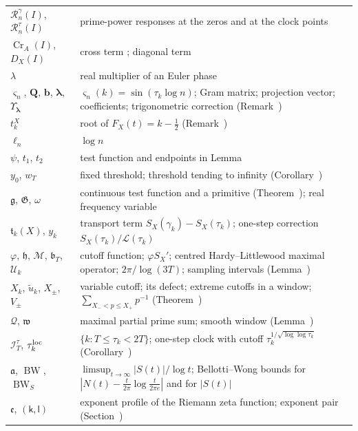 \documentclass[preprint,12pt]{elsarticle}
\makeatletter
\let\CG@origref\ref
\let\CG@origeqref\eqref
\newcommand{\CG@gettip}[1]{\@ifundefined{CGTip@#1}{Reference: #1}{\csname CGTip@#1\endcsname}}
\DeclareRobustCommand{\CGref}[1]{\pdftooltip{\CG@origref{#1}}{\CG@gettip{#1}}}
\DeclareRobustCommand{\CGeqref}[1]{\pdftooltip{\CG@origeqref{#1}}{\CG@gettip{#1}}}
\numberwithin{equation}{section}
\theoremstyle{plain}
\theoremstyle{definition}
\theoremstyle{remark}
\newcommand{\lL}{\mathcal L}
\newcommand{\Cr}{\operatorname{Cr}}
\newcommand{\BW}{\operatorname{BW}}
\newcommand{\Rg}{\mathcal R^{\gamma}}
\newcommand{\Rt}{\mathcal R^{\tau}}
\newcommand{\BWS}{\operatorname{BW}_S}
\makeatother
\begin{document}
\begin{center}
\begin{longtable}{p{}p{}}
$\Rg_n(I)$, $\Rt_n(I)$ & prime-power responses at the zeros and at the clock points \CGeqref{eq:two_responses}\\
$\Cr_A(I)$, $D_X(I)$ & cross term \CGeqref{eq:Cr_def}; diagonal term \CGeqref{eq:full_factor_gain}\\
$\lambda$ & real multiplier of an Euler phase\\
$\varsigma_n$, $\mathbf Q$, $\mathbf b$, $\boldsymbol\lambda$, $\Upsilon_{\boldsymbol\lambda}$ & $\varsigma_n(k)=\sin(\tau_k\log n)$; Gram matrix; projection vector; coefficients; trigonometric correction (Remark~\CGref{rem:matrix_projection})\\
$t_k^X$ & root of $F_X(t)=k-\frac12$ (Remark~\CGref{rem:localization})\\
$\ell_n$ & $\log n$\\
$\psi$, $t_1$, $t_2$ & test function and endpoints in Lemma~\CGref{lem:first_moment_identity}\\
$y_0$, $w_T$ & fixed threshold; threshold tending to infinity (Corollary~\CGref{cor:dichotomy})\\
$\mathfrak g$, $\mathfrak G$, $\omega$ & continuous test function and a primitive (Theorem~\CGref{thm:identity_g}); real frequency variable\\
$\mathfrak t_k(X)$, $y_k$ & transport term $S_X(\gamma_k)-S_X(\tau_k)$; one-step correction $S_X(\tau_k)/\lL(\tau_k)$\\
$\varphi$, $\mathfrak h$, $\mathcal M$, $\mathfrak b_T$, $\mathcal U_k$ & cutoff function; $\varphi S_X'$; centred Hardy--Littlewood maximal operator; $2\pi/\log(3T)$; sampling intervals (Lemma~\CGref{lem:transport})\\
$X_k$, $\tilde u_k$, $X_\pm$, $V_\pm$ & variable cutoff; its defect; extreme cutoffs in a window; $\sum_{X_-<p\le X_+}p^{-1}$ (Theorem~\CGref{thm:variable_cutoff})\\
$\mathcal Q$, $\mathfrak w$ & maximal partial prime sum; smooth window (Lemma~\CGref{lem:maximal_primes})\\
$\mathcal I_T^\tau$, $\tau_k^{\rm loc}$ & $\{k:T\le\tau_k<2T\}$; one-step clock with cutoff $\tau_k^{1/\sqrt{\log\log\tau_k}}$ (Corollary~\CGref{cor:local_clock})\\
$\mathfrak a$, $\BW$, $\BWS$ & $\limsup_{t\to\infty}|S(t)|/\log t$; Bellotti--Wong bounds for $|N(t)-\frac t{2\pi}\log\frac t{2\pi e}|$ and for $|S(t)|$ \CGeqref{eq:BWS_def}\\
$\mathfrak e$, $(\mathsf k,\mathsf l)$ & exponent profile of the Riemann zeta function; exponent pair (Section~\CGref{sec:envelope})\\

\end{longtable}
\end{center}
\end{document}
